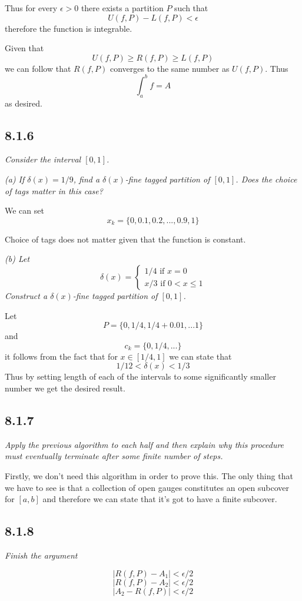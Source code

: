 \documentclass[11pt,oneside,titlepage]{book}
\begin{document}
Thus for every $\epsilon > 0$ there exists a partition $P$ such that
$$U(f, P) - L(f, P) < \epsilon$$
therefore the function is integrable.

Given that
$$U(f, P) \geq R(f, P) \geq L(f, P)$$
we can follow that $R(f, P)$ converges to the same number as $U(f, P)$. Thus
$$ \int_a^b f = A$$
as desired.

\subsection*{8.1.6}
\textit{Consider the interval $[0, 1]$.}

\textit{(a) If $\delta(x) = 1/9$, find a $\delta(x)$-fine tagged partition of $[0, 1]$. Does the
  choice of tags matter in this case?}

We can set
$$x_k = \{0, 0.1, 0.2, ..., 0.9, 1\}$$

Choice of tags does not matter given that the function is constant.

\textit{(b) Let}
$$
\delta(x) =
\begin{cases}
  1/4 \text{ if } x = 0 \\
  x/3 \text{ if } 0 < x \leq 1
\end{cases}
$$
\textit{Construct a $\delta(x)$-fine tagged partition of $[0, 1]$.}

Let
$$P = \{0, 1/4, 1/4 + 0.01, ... 1\}$$
and
$$c_k = \{0, 1/4, ... \}$$
it follows from the fact that for $x \in [1/4, 1]$ we can state that 
$$1/12 < \delta(x) < 1/3$$
Thus by setting length of each of the intervals to some significantly smaller number we get the
desired result.

\subsection*{8.1.7}
\textit{Apply the previous algorithm to each half and then explain why this procedure
  must eventually terminate after some finite number of steps.}

Firstly, we don't need this algorithm in order to prove this. The only thing that we have
to see is that a collection of open gauges constitutes an open subcover for $[a, b]$ and
therefore we can state that it's got to have a finite subcover.

\subsection*{8.1.8}
\textit{Finish the argument}

$$|R(f, P) - A_1| < \epsilon/2$$
$$|R(f, P) - A_2| < \epsilon/2$$
$$|A_2 - R(f, P)| < \epsilon/2$$
\end{document}
